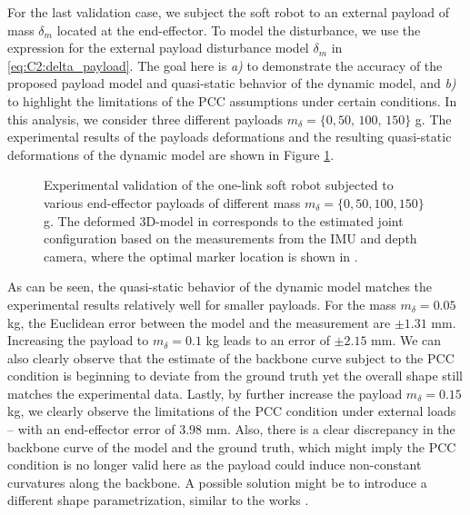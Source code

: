 For the last validation case, we subject the soft robot to an external payload of mass $\delta_m$ located at the end-effector. To model the disturbance, we use the expression for the external payload disturbance model $\delta_m$ in \eqref{eq:C2:delta_payload}. The goal here is \textit{a)} to demonstrate the accuracy of the proposed payload model and quasi-static behavior of the dynamic model, and \textit{b)} to highlight the limitations of the PCC assumptions under certain conditions. In this analysis, we consider three different payloads $m_\delta = \{0, 50,\,100,\,150\}$ \si{\gram}. The experimental results of the payloads deformations and the resulting quasi-static deformations of the dynamic model are shown in Figure \ref{fig:C2:compare_deflect}. 

%
\begin{figure}[!t]
  \centering
  \ifx\printFigures\undefined
  \else
  
  \fi
  \vspace{-5mm}
  \caption{Experimental validation of the one-link soft robot subjected to various end-effector payloads of different mass $m_\delta = \{0,50,100,150\}$ \si{\gram}. The deformed 3D-model in  corresponds to the estimated joint configuration based on the measurements from the IMU and depth camera, where the optimal marker location is shown in .}
  \label{fig:C2:compare_deflect}
\end{figure}
%

As can be seen, the quasi-static behavior of the dynamic model matches the experimental results relatively well for smaller payloads. For the mass $m_\delta = 0.05$ kg, the Euclidean error between the model and the measurement are $\pm1.31$ mm. Increasing the payload to $m_\delta = 0.1$ kg leads to an error of $\pm2.15$ mm. We can also clearly observe that the estimate of the backbone curve subject to the PCC condition is beginning to deviate from the ground truth yet the overall shape still matches the experimental data. Lastly, by further increase the payload $m_\delta = 0.15$ kg, we clearly observe the limitations of the PCC condition under external loads -- with an end-effector error of $3.98$ mm. Also, there is a clear discrepancy in the backbone curve of the model and the ground truth, which might imply the PCC condition is no longer valid here as the payload could induce non-constant curvatures along the backbone. A possible solution might be to introduce a different shape parametrization, similar to the works \cite{Chirikjian1994,Boyer2021,Renda2020,DellaSantina2020}.

